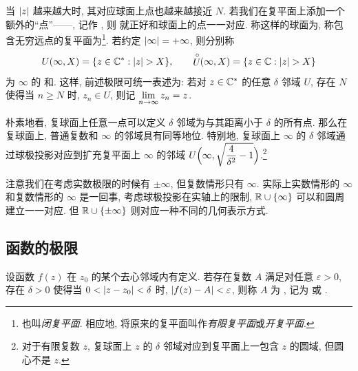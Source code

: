 当 $\lvert z\rvert$ 越来越大时, 其对应球面上点也越来越接近 $N$.
若我们在复平面上添加一个额外的``点''——, 记作 \nouns{$\infty$}, 则 就正好和球面上的点一一对应.
称这样的球面为, 称包含无穷远点的复平面为\footnote{
  也叫\emph{闭复平面}. 相应地, 将原来的复平面叫作\emph{有限复平面}或\emph{开复平面}.
}.
若约定 $\lvert\infty\rvert=+\infty$, 则分别称
\[
  U(\infty,X)=\{z\in{\mathbb{C}}^*\mathrel{:} \lvert z\rvert>X\},\qquad
  \stackrel{\circ}{U}\!\!(\infty,X)=\{z\in{\mathbb{C}}\mathrel{:} \lvert z\rvert>X\}
\]
为 $\infty$ 的 和.
这样, 前述极限可统一表述为: 若对 $z\in{\mathbb{C}}^*$ 的任意 $\delta$ 邻域 $U$, 存在 $N$ 使得当 $n\ge N$ 时, $z_n\in U$, 则记 $\lim\limits_{n\rightarrow\infty}z_n=z$.

朴素地看, 复球面上任意一点可以定义 $\delta$ 邻域为与其距离小于 $\delta$ 的所有点.
那么在复球面上, 普通复数和 $\infty$ 的邻域具有同等地位.
特别地, 复球面上 $\infty$ 的 $\delta$ 邻域通过球极投影对应到扩充复平面上 $\infty$ 的邻域
$U\Bigl(\infty, \sqrt{\dfrac4{\delta^2}-1}\Bigr)$.\footnote{
  对于有限复数 $z$, 复球面上 $z$ 的 $\delta$ 邻域对应到复平面上一包含 $z$ 的圆域, 但圆心不是 $z$.
}

注意我们在考虑实数极限的时候有 $\pm\infty$, 但复数情形只有 $\infty$.
实际上实数情形的 $\infty$ 和复数情形的 $\infty$ 是一回事, 考虑球极投影在实轴上的限制, ${\mathbb{R}}\cup\{\infty\}$ 可以和圆周建立一一对应.
但 ${\mathbb{R}}\cup\{\pm\infty\}$ 则对应一种不同的几何表示方式.


\subsection{函数的极限}

\begin{definition}
  设函数 $f(z)$ 在 $z_0$ 的某个去心邻域内有定义.
  若存在复数 $A$ 满足对任意 $\varepsilon>0$, 存在 $\delta>0$ 使得当 $0<\lvert z-z_0\rvert<\delta$ 时, $\lvert f(z)-A\rvert<\varepsilon$, 则称 $A$ 为 , 记为  或 .
\end{definition}

